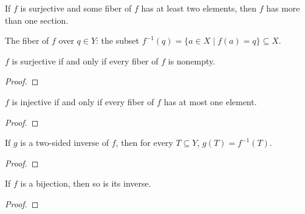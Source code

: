 \begin{proposition}
  \label{prop:prelims:many-sections}
  If $f$ is surjective and some fiber of $f$ has at least two
  elements, then $f$ has more than one section.
\end{proposition}

\begin{definition}[Fiber]
  \label{def:prelims:fiber}
  \leanok
  The fiber of $f$ over $q \in Y$: the subset
  $f^{-1}(q) = \{a \in X \mid f(a) = q\} \subseteq X$.
\end{definition}

\begin{proposition}
  \label{prop:prelims:surjective-iff-fiber-nonempty}
  \leanok
  $f$ is surjective if and only if every fiber of $f$ is nonempty.
\end{proposition}
\begin{proof}
  \leanok
\end{proof}

\begin{proposition}
  \label{prop:prelims:injective-iff-fiber-subsingleton}
  \leanok
  $f$ is injective if and only if every fiber of $f$ has at most one
  element.
\end{proposition}
\begin{proof}
  \leanok
\end{proof}

\begin{proposition}
  \label{prop:prelims:image-inverse-eq-preimage}
  \leanok
  If $g$ is a two-sided inverse of $f$, then for every $T \subseteq Y$,
  $g(T) = f^{-1}(T)$.
\end{proposition}
\begin{proof}
  \leanok
\end{proof}

\begin{exercise}
  \label{exer:prelims:2.3-inv-fun}
  \leanok
  If $f$ is a bijection, then so is its inverse.
\end{exercise}
\begin{proof}
  \leanok
\end{proof}


